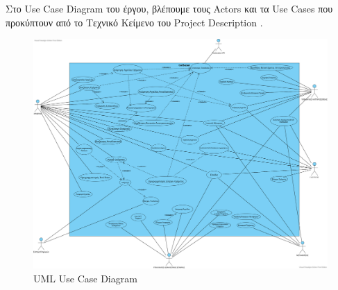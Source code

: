\documentclass{../ol-softwaremanual}
\begin{document}
	
	\newpage
	
	
	\vspace{25pt}
	
	\flushleft
	
	Στο \en Use Case Diagram \gr του έργου, βλέπουμε τους \en Actors \gr και τα \en Use Cases \gr που προκύπτουν από το Τεχνικό Κείμενο του \en Project Description \gr.
	
	\begin{figure}[htbp!]
		\includegraphics[scale=0.23]{img/UML_Use_case_diagram.png}
		\caption{\en UML Use Case Diagram \gr}
	\end{figure}
	
	
	
	
\end{document}
